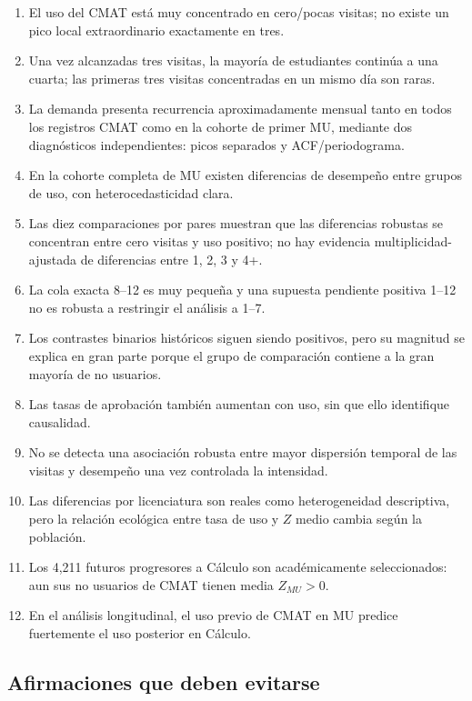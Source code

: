 \documentclass[11pt,letterpaper]{article}
\begin{document}
\begin{enumerate}[leftmargin=*]
\item El uso del CMAT está muy concentrado en cero/pocas visitas; no existe un pico local extraordinario exactamente en tres.
\item Una vez alcanzadas tres visitas, la mayoría de estudiantes continúa a una cuarta; las primeras tres visitas concentradas en un mismo día son raras.
\item La demanda presenta recurrencia aproximadamente mensual tanto en todos los registros CMAT como en la cohorte de primer MU, mediante dos diagnósticos independientes: picos separados y ACF/periodograma.
\item En la cohorte completa de MU existen diferencias de desempeño entre grupos de uso, con heterocedasticidad clara.
\item Las diez comparaciones por pares muestran que las diferencias robustas se concentran entre cero visitas y uso positivo; no hay evidencia multiplicidad-ajustada de diferencias entre 1, 2, 3 y 4+.
\item La cola exacta 8--12 es muy pequeña y una supuesta pendiente positiva 1--12 no es robusta a restringir el análisis a 1--7.
\item Los contrastes binarios históricos siguen siendo positivos, pero su magnitud se explica en gran parte porque el grupo de comparación contiene a la gran mayoría de no usuarios.
\item Las tasas de aprobación también aumentan con uso, sin que ello identifique causalidad.
\item No se detecta una asociación robusta entre mayor dispersión temporal de las visitas y desempeño una vez controlada la intensidad.
\item Las diferencias por licenciatura son reales como heterogeneidad descriptiva, pero la relación ecológica entre tasa de uso y $Z$ medio cambia según la población.
\item Los 4,211 futuros progresores a Cálculo son académicamente seleccionados: aun sus no usuarios de CMAT tienen media $Z_{MU}>0$.
\item En el análisis longitudinal, el uso previo de CMAT en MU predice fuertemente el uso posterior en Cálculo.
\end{enumerate}

\subsection{Afirmaciones que deben evitarse}
\end{document}
